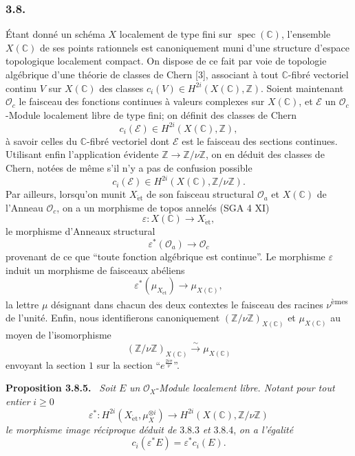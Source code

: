 \documentclass[11pt]{article}
\newenvironment{statement}[1]{\par\medskip\noindent\textbf{#1.}\ }{\par\medskip}
\providecommand{\et}{\mathrm{\acute{e}t}}
\providecommand{\et}{\acute{e}t}
\begin{document}
\subsubsection*{3.8.}
Étant donné un schéma $X$ localement de type fini sur $\operatorname{spec}(\mathbb C)$, l'ensemble $X(\mathbb C)$ de ses points rationnels est canoniquement muni d'une structure d'espace topologique localement compact. On dispose de ce fait par voie de topologie algébrique d'une théorie de classes de Chern [3], associant à tout $\mathbb C$-fibré vectoriel continu $V$ sur $X(\mathbb C)$ des classes $c_i(V)\in H^{2i}(X(\mathbb C),\mathbb Z)$. Soient maintenant $\mathcal O_c$ le faisceau des fonctions continues à valeurs complexes sur $X(\mathbb C)$, et $\mathcal E$ un $\mathcal O_c$-Module localement libre de type fini; on définit des classes de Chern
\[
c_i(\mathcal E)\in H^{2i}(X(\mathbb C),\mathbb Z),
\]
à savoir celles du $\mathbb C$-fibré vectoriel dont $\mathcal E$ est le faisceau des sections continues. Utilisant enfin l'application évidente $\mathbb Z\to\mathbb Z/\nu\mathbb Z$, on en déduit des classes de Chern, notées de même s'il n'y a pas de confusion possible
\[
c_i(\mathcal E)\in H^{2i}(X(\mathbb C),\mathbb Z/\nu\mathbb Z).
\tag{3.8.1}
\]
Par
ailleurs, lorsqu'on munit $X_{\et}$ de son faisceau structural $\mathcal O_a$ et $X(\mathbb C)$ de l'Anneau $\mathcal O_c$, on a un morphisme de topos annelés (SGA 4 XI)
\[
\varepsilon:X(\mathbb C)\to X_{\et},
\]
le morphisme d'Anneaux structural
\[
\varepsilon^*(\mathcal O_a)\to\mathcal O_c
\tag{3.8.2}
\]
provenant de ce que ``toute fonction algébrique est continue''. Le morphisme $\varepsilon$ induit un morphisme de faisceaux abéliens
\[
\varepsilon^*(\mu_{X_{\et}})\to \mu_{X(\mathbb C)},
\tag{3.8.3}
\]
la lettre $\mu$ désignant dans chacun des deux contextes le faisceau des racines $\nu$\textsuperscript{èmes} de l'unité. Enfin, nous identifierons canoniquement $(\mathbb Z/\nu\mathbb Z)_{X(\mathbb C)}$ et $\mu_{X(\mathbb C)}$ au moyen de l'isomorphisme
\[
(\mathbb Z/\nu\mathbb Z)_{X(\mathbb C)}
 \xrightarrow{\sim}\mu_{X(\mathbb C)}
\tag{3.8.4}
\]
envoyant la section $1$ sur la section ``$e^{\frac{2i\pi}{\nu}}$''.

\begin{statement}{Proposition 3.8.5}
\emph{Soit} $E$ \emph{un} $\mathcal O_X$-\emph{Module localement libre. Notant pour tout entier} $i\ge0$
\[
\varepsilon^*:H^{2i}(X_{\et},\mu_X^{\otimes i})
\to H^{2i}(X(\mathbb C),\mathbb Z/\nu\mathbb Z)
\]
\emph{le morphisme image réciproque déduit de} 3.8.3 \emph{et} 3.8.4, \emph{on a l'égalité}
\[
c_i(\varepsilon^*E)=\varepsilon^*c_i(E).
\]
\end{statement}
\end{document}

